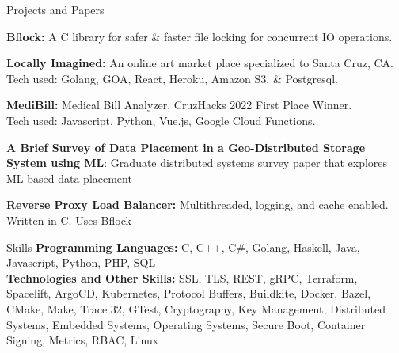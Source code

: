\documentclass{resume} %
\begin{document}
\begin{rSection}{Projects and Papers}

    {\textbf{Bflock:}} A C library for safer \& faster file locking for concurrent IO operations.

    {\textbf{Locally Imagined:}} An online art market place specialized to Santa Cruz, CA.
    \\ Tech used: Golang, GOA, React, Heroku, Amazon S3, \& Postgresql.
    
    {\textbf{MediBill:}} Medical Bill Analyzer, CruzHacks 2022 First Place Winner.
    \\Tech used: Javascript, Python, Vue.js, Google Cloud Functions.

    {\textbf{A Brief Survey of Data Placement in a Geo-Distributed Storage System using ML}: Graduate distributed systems survey paper that explores ML-based data placement} 

    {\textbf{Reverse Proxy Load Balancer:} } Multithreaded, logging, and cache enabled. Written in C. Uses Bflock
\end{rSection}

\begin{rSection}{Skills}
    {\textbf{Programming Languages:} } C, C++, C\#, Golang, Haskell, Java, Javascript, Python, PHP, SQL
    \\{\textbf{Technologies and Other Skills:} }
    SSL, TLS, REST, gRPC, Terraform, Spacelift, ArgoCD, Kubernetes, Protocol Buffers, Buildkite, Docker,
    Bazel, CMake, Make, Trace 32, GTest, Cryptography, Key Management, Distributed Systems, Embedded Systems, Operating Systems,
    Secure Boot, Container Signing, Metrics, RBAC, Linux
\end{rSection}
    
\end{document}
